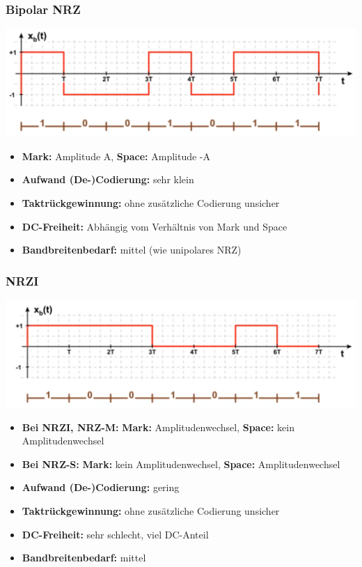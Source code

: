 \subsubsection{Bipolar NRZ}
\begin{center}
	\includegraphics[width=0.6\columnwidth]{Images/nrz1}
\end{center}
\begin{itemize}[nosep]
	\item \textbf{Mark:} Amplitude A, \textbf{Space:} Amplitude -A
	\item \textbf{Aufwand (De-)Codierung:} sehr klein
	\item \textbf{Taktrückgewinnung:} ohne zusätzliche Codierung unsicher
	\item \textbf{DC-Freiheit:} Abhängig vom Verhältnis von Mark und Space
	\item \textbf{Bandbreitenbedarf:} mittel (wie unipolares NRZ)
\end{itemize}

\subsubsection{NRZI}
\begin{center}
	\includegraphics[width=0.6\columnwidth]{Images/nrzi}
\end{center}
\begin{itemize}[nosep]
	\item \textbf{Bei NRZI, NRZ-M:} \textbf{Mark:} Amplitudenwechsel, \textbf{Space:} kein Amplitudenwechsel
	\item \textbf{Bei NRZ-S:} \textbf{Mark:} kein Amplitudenwechsel, \textbf{Space:} Amplitudenwechsel
	\item \textbf{Aufwand (De-)Codierung:} gering
	\item \textbf{Taktrückgewinnung:} ohne zusätzliche Codierung unsicher
	\item \textbf{DC-Freiheit:} sehr schlecht, viel DC-Anteil
	\item \textbf{Bandbreitenbedarf:} mittel
\end{itemize}


